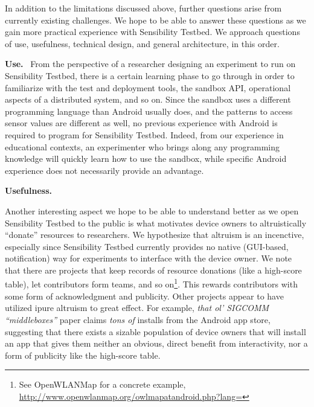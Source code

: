 In addition to the limitations discussed above, further questions 
arise from currently existing challenges. We hope to be able to 
answer these questions as we gain more practical experience with 
Sensibility Testbed.  
We approach questions of use, usefulness, technical design, and
general architecture, in this order.


\textbf{Use.}~
From the perspective of a researcher designing an experiment to 
run on Sensibility Testbed, there is a certain learning phase 
to go through in order to familiarize with the test and deployment 
tools, the sandbox API, operational aspects of a distributed system, 
and so on. Since the sandbox uses a different programming language 
than Android usually does, and the patterns to access sensor values 
are different as well, no previous experience with Android is required 
to program for Sensibility Testbed. Indeed, from our experience in 
educational contexts, an experimenter who brings along any programming 
knowledge will quickly learn how to use the sandbox, while specific 
Android experience does not necessarily provide an advantage.


\textbf{Usefulness.}~

Another interesting aspect we hope to be able to understand better as 
we open Sensibility Testbed to the public is what motivates device 
owners to altruistically ``donate'' resources to researchers. 
We hypothesize that altruism is an incenctive, especially since 
Sensibility Testbed currently provides no native (GUI-based, 
notification) way for experiments to interface with the device 
owner. We note that there are projects that keep records of 
resource donations (like a high-score table), let contributors form 
teams, and so on\footnote{See OpenWLANMap for a concrete example, \url{http://www.openwlanmap.org/owlmapatandroid.php?lang=}}.
This rewards contributors with some form of acknowledgment and 
publicity.
Other projects appear to have utilized ipure altruism to great effect.
For example, \textit{that ol' SIGCOMM ``middleboxes''} paper 
\cite{it} claims \textit{tons of} installs from the Android app 
store, suggesting that there exists a sizable population of device 
owners that will install an app that gives them neither an obvious, 
direct benefit from interactivity, nor a form of publicity like 
the high-score table.


